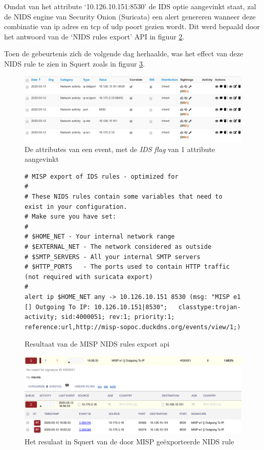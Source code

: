 \documentclass[a4paper,12pt]{report}
\begin{document}
Omdat van het attribute `10.126.10.151:8530' de IDS optie aangevinkt staat, zal de NIDS engine van Security Onion (Suricata) een alert genereren wanneer deze combinatie van ip adres en tcp of udp poort gezien wordt.
Dit werd bepaald door het antwoord van de `NIDS rules export' API in figuur \ref{fig:misp-export-txt}.

Toen de gebeurtenis zich de volgende dag herhaalde, was het effect van deze NIDS rule te zien in Squert zoals in figuur \ref{fig:misp-export-squert}.

\begin{figure}[H]
  \centering
  \includegraphics[width=\textwidth]{misp-export-flag}
  \caption{De attributes van een event, met de \emph{IDS flag} van 1 attribute aangevinkt}
  \label{fig:misp-export-flag}
\end{figure}

\begin{figure}[H]
  \begin{lstlisting}
# MISP export of IDS rules - optimized for 
#
# These NIDS rules contain some variables that need to exist in your configuration.
# Make sure you have set:
#
# $HOME_NET - Your internal network range
# $EXTERNAL_NET - The network considered as outside
# $SMTP_SERVERS - All your internal SMTP servers
# $HTTP_PORTS   - The ports used to contain HTTP traffic (not required with suricata export)
# 
alert ip $HOME_NET any -> 10.126.10.151 8530 (msg: "MISP e1 [] Outgoing To IP: 10.126.10.151|8530";   classtype:trojan-activity; sid:4000051; rev:1; priority:1; reference:url,http://misp-sopoc.duckdns.org/events/view/1;)
  \end{lstlisting}
  \caption{Resultaat van de MISP NIDS rules export api}
  \label{fig:misp-export-txt}
\end{figure}

\begin{figure}[H]
  \centering
  \includegraphics[width=\textwidth]{misp-export-squert}
  \caption{Het resulaat in Squert van de door MISP geëxporteerde NIDS rule}
  \label{fig:misp-export-squert}
\end{figure}
\end{document}
